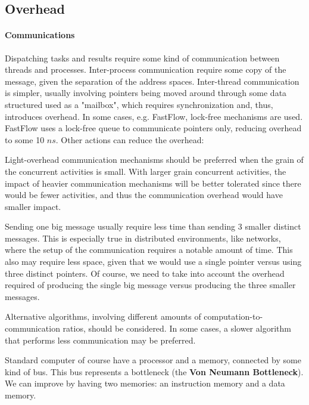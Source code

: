\documentclass[10pt]{report}
\begin{document}
\subsection{Overhead}
\paragraph{Communications}
Dispatching tasks and results require some kind of communication between threads and processes. Inter-process communication require some copy of the message, given the separation of the address spaces. Inter-thread communication is simpler, usually involving pointers being moved around through some data structured used as a "mailbox", which requires synchronization and, thus, introduces overhead. In some cases, e.g. FastFlow, lock-free mechanisms are used. FastFlow uses a lock-free queue to communicate pointers only, reducing overhead to some 10 $ns$. Other actions can reduce the overhead:
\begin{list}{}{}
	\item Light-overhead communication mechanisms should be preferred when the grain of the concurrent activities is small. With larger grain concurrent activities, the impact of heavier communication mechanisms will be better tolerated since there would be fewer activities, and thus the communication overhead would have smaller impact.
	\item Sending one big message usually require less time than sending 3 smaller distinct messages. This is especially true in distributed environments, like networks, where the setup of the communication requires a notable amount of time. This also may require less space, given that we would use a single pointer versus using three distinct pointers. Of course, we need to take into account the overhead required of producing the single big message versus producing the three smaller messages.
	\item Alternative algorithms, involving different amounts of computation-to-communication ratios, should be considered. In some cases, a slower algorithm that performs less communication may be preferred.
\end{list}
Standard computer of course have a processor and a memory, connected by some kind of bus. This bus represents a bottleneck (the \textbf{Von Neumann Bottleneck}). We can improve by having two memories: an instruction memory and a data memory.\\\\
\end{document}
